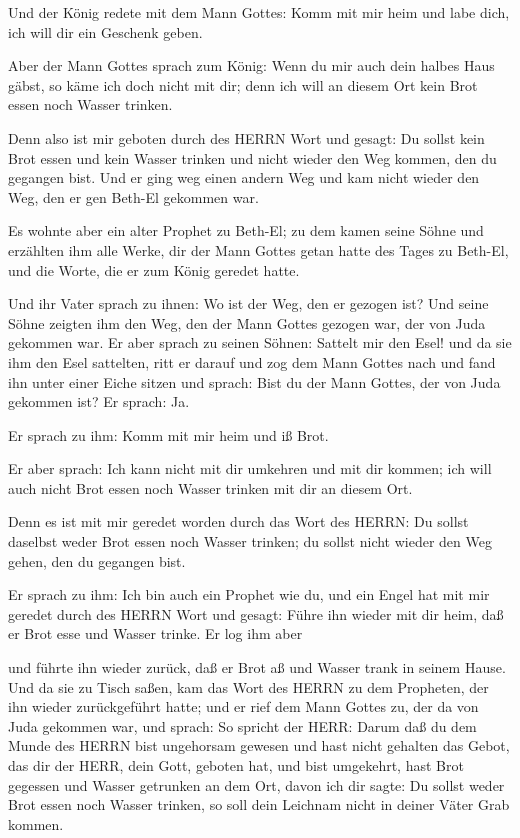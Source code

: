  Und der König redete mit dem Mann Gottes: Komm mit mir heim
und labe dich, ich will dir ein Geschenk geben.

 Aber der Mann Gottes sprach zum König: Wenn du mir auch
dein halbes Haus gäbst, so käme ich doch nicht mit dir; denn ich will an
diesem Ort kein Brot essen noch Wasser trinken.

 Denn also ist mir geboten durch des HERRN Wort und gesagt:
Du sollst kein Brot essen und kein Wasser trinken und nicht wieder den
Weg kommen, den du gegangen bist.  Und er ging weg einen
andern Weg und kam nicht wieder den Weg, den er gen Beth-El gekommen
war.

 Es wohnte aber ein alter Prophet zu Beth-El; zu dem kamen
seine Söhne und erzählten ihm alle Werke, dir der Mann Gottes getan
hatte des Tages zu Beth-El, und die Worte, die er zum König geredet
hatte.

 Und ihr Vater sprach zu ihnen: Wo ist der Weg, den er
gezogen ist? Und seine Söhne zeigten ihm den Weg, den der Mann Gottes
gezogen war, der von Juda gekommen war.  Er aber sprach zu
seinen Söhnen: Sattelt mir den Esel! und da sie ihm den Esel sattelten,
ritt er darauf  und zog dem Mann Gottes nach und fand ihn
unter einer Eiche sitzen und sprach: Bist du der Mann Gottes, der von
Juda gekommen ist? Er sprach: Ja.

 Er sprach zu ihm: Komm mit mir heim und iß Brot.

 Er aber sprach: Ich kann nicht mit dir umkehren und mit
dir kommen; ich will auch nicht Brot essen noch Wasser trinken mit dir
an diesem Ort.

 Denn es ist mit mir geredet worden durch das Wort des
HERRN: Du sollst daselbst weder Brot essen noch Wasser trinken; du
sollst nicht wieder den Weg gehen, den du gegangen bist.

 Er sprach zu ihm: Ich bin auch ein Prophet wie du, und ein
Engel hat mit mir geredet durch des HERRN Wort und gesagt: Führe ihn
wieder mit dir heim, daß er Brot esse und Wasser trinke. Er log ihm aber

 und führte ihn wieder zurück, daß er Brot aß und Wasser
trank in seinem Hause.  Und da sie zu Tisch saßen, kam das
Wort des HERRN zu dem Propheten, der ihn wieder zurückgeführt hatte;
 und er rief dem Mann Gottes zu, der da von Juda gekommen
war, und sprach: So spricht der HERR: Darum daß du dem Munde des HERRN
bist ungehorsam gewesen und hast nicht gehalten das Gebot, das dir der
HERR, dein Gott, geboten hat,  und bist umgekehrt, hast
Brot gegessen und Wasser getrunken an dem Ort, davon ich dir sagte: Du
sollst weder Brot essen noch Wasser trinken, so soll dein Leichnam nicht
in deiner Väter Grab kommen.

